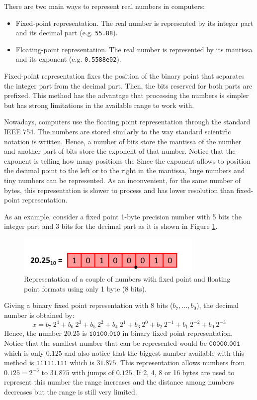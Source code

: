 There are two main ways to represent real numbers in computers: 
\begin{itemize}
\item Fixed-point representation. 
The real number is represented by its integer part and its decimal part (e.g. \texttt{55.88}). 
\item Floating-point representation. 
 The real number is represented by its mantissa and its exponent  (e.g. \texttt{0.5588e02}).
\end{itemize} 

Fixed-point representation fixes the position of the binary point that separates 
the integer part from the decimal part. 
Then, the bits reserved for both parts are prefixed. 
This method has the advantage that processing the numbers is simpler
but has strong limitations in the available range  to work with.

Nowadays,  computers use  the floating point representation through the standard IEEE 754.
The numbers are stored similarly to the way standard scientific notation is written. 
Hence, a number of bits store the mantissa of the number and another part of bits store the exponent 
of that number. 
Notice that the exponent is telling how many positions the 
Since the exponent allows to position the decimal point 
to the left or to the right in the mantissa,  huge numbers and tiny numbers can be represented.
As an inconvenient, for the same number of bytes, 
this representation is slower to process and has lower resolution than fixed-point representation. 


As an example, 
consider a fixed point 1-byte precision number with 5 bits the integer part and 3 bits
for the decimal part as it is shown in Figure \ref{fig:FixedFloat}. 

\begin{figure}[h]
    \centering
    \includegraphics[width= 0.8\textwidth]{./doc/Figures/FixedFloat2.png}
    \caption{Representation of a couple of numbers with fixed point and floating point formats using only 1 byte (8 bits).}
    \label{fig:FixedFloat}
\end{figure}
Giving a binary fixed point representation with 8 bits ($b_7, \ldots, b_0$), the decimal number is obtained by: 
$$
   x = b_7 \ 2^4 + b_6 \ 2^3 + b_5 \ 2^2  + b_4 \ 2^1 + b_3 \ 2^0 + b_2 \ 2^{-1}  + b_1 \ 2^{-2} + b_0 \ 2^{-3}
$$
Hence, the number $20.25$ is $\texttt{10100.010}$ in binary fixed point 
representation. 
Notice that the smallest number that can be represented would be 
$\texttt{00000.001}$ which is only $0.125$ 
and also notice that the biggest number available with this method is $\texttt{11111.111}$
which is $31.875$. 
This representation allows numbers from $0.125 = 2^{-3}$ to $31.875$  with jumps of $0.125$. 
If 2, 4, 8 or 16 bytes are used to represent this number the range increases 
and the distance among numbers decreases but the range is still very limited. 


